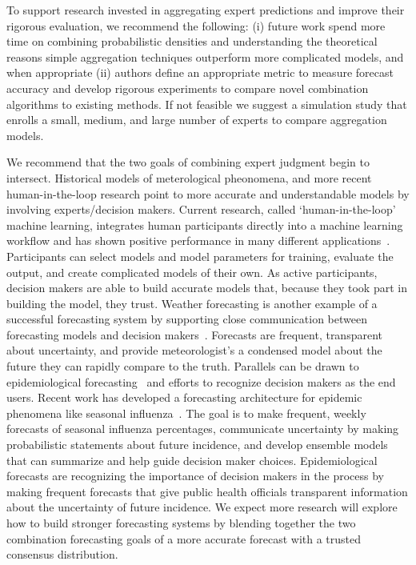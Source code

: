 \documentclass[preprint,authoryear]{elsarticle}
\begin{document}
To support research invested in aggregating expert predictions and improve their rigorous evaluation, we recommend the following: (i) future work spend more time on combining probabilistic densities and understanding the theoretical reasons simple aggregation techniques outperform more complicated models, and when appropriate (ii) authors define an appropriate metric to measure forecast accuracy and develop rigorous experiments to compare novel combination algorithms to existing methods.
If not feasible we suggest a simulation study that enrolls a small, medium, and large number of experts to compare aggregation models.

We recommend that the two goals of combining expert judgment begin to intersect.
Historical models of meterological pheonomena, and more recent human-in-the-loop research point to more accurate and understandable models by involving experts/decision makers.
Current research, called `human-in-the-loop' machine learning, integrates human participants directly into a machine learning workflow and has shown positive performance in many different applications~\cite{cranor2008framework,holzinger2016interactive,yu2015lsun,li2017human}.
Participants can select models and model parameters for training, evaluate the output, and create complicated models of their own.
As active participants, decision makers are able to build accurate models that, because they took part in building the model, they trust.
%
Weather forecasting is another example of a successful forecasting system by supporting close communication between forecasting models and decision makers~\cite{murphy1984probability,murphy1974probability,murphy1974subjective}.
Forecasts are frequent, transparent about uncertainty, and provide meteorologist's a condensed model about the future they can rapidly compare to the truth.
Parallels can be drawn to epidemiological forecasting~\cite{biggerstaff2016results,biggerstaff2018results,reich2019collaborative,mcgowan2019collaborative} and efforts to recognize decision makers as the end users.
Recent work has developed a forecasting architecture for epidemic phenomena like seasonal influenza~\cite{reich2019collaborative}.
The goal is to make frequent, weekly forecasts of seasonal influenza percentages, communicate uncertainty by making probabilistic statements about future incidence, and develop ensemble models that can summarize and help guide decision maker choices.
Epidemiological forecasts are recognizing the importance of decision makers in the process by making frequent forecasts that give public health officials transparent information about the uncertainty of future incidence.
We expect more research will explore how to build stronger forecasting systems by blending together the two combination forecasting goals of a more accurate forecast with a trusted consensus distribution.
\end{document}
